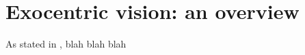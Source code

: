 \section{Exocentric vision: an overview}
\label{sec:exo}

As stated in \cite{sugimoto}, blah blah blah
